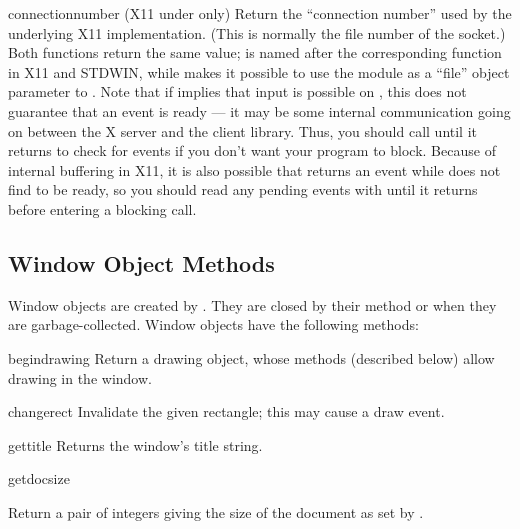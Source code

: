 \begin{funcdesc}{connectionnumber}{}
(X11 under \UNIX{} only) Return the ``connection number'' used by the
underlying X11 implementation.  (This is normally the file number of
the socket.)  Both functions return the same value;
 is named after the corresponding function in
X11 and STDWIN, while  makes it possible to use the
 module as a ``file'' object parameter to
.  Note that if  implies that
input is possible on , this does not guarantee that an
event is ready --- it may be some internal communication going on
between the X server and the client library.  Thus, you should call
 until it returns  to check for
events if you don't want your program to block.  Because of internal
buffering in X11, it is also possible that 
returns an event while  does not find  to
be ready, so you should read any pending events with
 until it returns  before entering
a blocking  call.
\end{funcdesc}

\subsection{Window Object Methods}

Window objects are created by .  They are closed
by their  method or when they are garbage-collected.
Window objects have the following methods:

\renewcommand{\indexsubitem}{(window method)}

\begin{funcdesc}{begindrawing}{}
Return a drawing object, whose methods (described below) allow drawing
in the window.
\end{funcdesc}

\begin{funcdesc}{change}{rect}
Invalidate the given rectangle; this may cause a draw event.
\end{funcdesc}

\begin{funcdesc}{gettitle}{}
Returns the window's title string.
\end{funcdesc}

\begin{funcdesc}{getdocsize}{}
\begin{sloppypar}
Return a pair of integers giving the size of the document as set by
.
\end{sloppypar}
\end{funcdesc}

